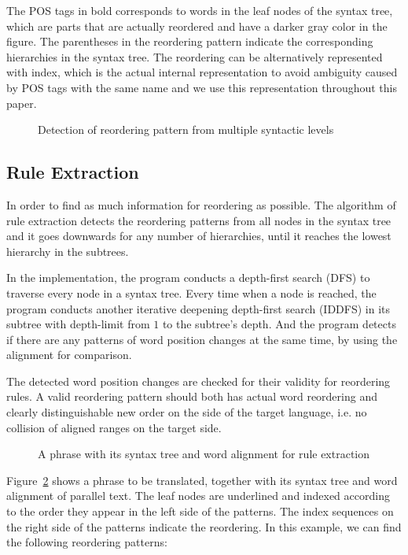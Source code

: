 \documentclass[a4paper]{article}
\begin{document}
The POS tags in bold corresponds to words in the leaf nodes of the syntax tree, which are parts that are actually reordered and have a darker gray color in the figure. The parentheses in the reordering pattern indicate the corresponding hierarchies in the syntax tree. The reordering can be alternatively represented with index, which is the actual internal representation to avoid ambiguity caused by POS tags with the same name and we use this representation throughout this paper.

\begin{figure}
\centering

\caption{Detection of reordering pattern from multiple syntactic levels}
\label{unstructured}
\end{figure}

\subsection{Rule Extraction}

In order to find as much information for reordering as possible. The algorithm of rule extraction detects the reordering patterns from all nodes in the syntax tree and it goes downwards for any number of hierarchies, until it reaches the lowest hierarchy in the subtrees.

In the implementation, the program conducts a depth-first search (DFS) to traverse every node in a syntax tree. Every time when a node is reached, the program conducts another iterative deepening depth-first search (IDDFS) in its subtree with depth-limit from $1$ to the subtree's depth. And the program detects if there are any patterns of word position changes at the same time, by using the alignment for comparison.

The detected word position changes are checked for their validity for reordering rules. A valid reordering pattern should both has actual word reordering and clearly distinguishable new order on the side of the target language, i.e. no collision of aligned ranges on the target side.

\begin{figure}
\centering

\caption{A phrase with its syntax tree and word alignment for rule extraction}
\label{extract}
\end{figure}

Figure~\ref{extract} shows a phrase to be translated, together with its syntax tree and word alignment of parallel text. The leaf nodes are underlined and indexed according to the order they appear in the left side of the patterns. The index sequences on the right side of the patterns indicate the reordering. In this example, we can find the following reordering patterns:\bigskip
\end{document}

